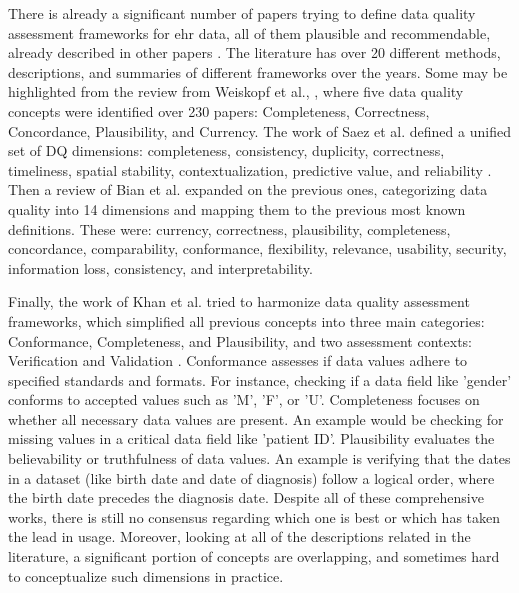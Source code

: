 
There is already a significant number of papers trying to define data quality assessment frameworks for \ac{ehr} data, all of them plausible and recommendable, already described in other papers \cite{bianAssessingPracticeData2020}. The literature has over 20 different methods, descriptions, and summaries of different frameworks over the years. Some may be highlighted from the review from Weiskopf et al., \cite{weiskopfMethodsDimensionsElectronic2013}, where five data quality concepts were identified over 230 papers: Completeness, Correctness, Concordance, Plausibility, and Currency. 
The work of Saez et al. defined a unified set of DQ dimensions: completeness, consistency, duplicity, correctness, timeliness, spatial stability, contextualization, predictive value, and reliability \cite{saezOrganizingDataQuality2012}. Then a review of Bian et al. \cite{bianAssessingPracticeData2020} expanded on the previous ones, categorizing data quality into 14 dimensions and mapping them to the previous most known definitions. These were: currency, correctness, plausibility, completeness, concordance, comparability, conformance, flexibility, relevance, usability, security, information loss, consistency, and interpretability.

Finally, the work of Khan et al. tried to harmonize data quality assessment frameworks, which simplified all previous concepts into three main categories: Conformance, Completeness, and Plausibility, and two assessment contexts: Verification and Validation \cite{kahnHarmonizedDataQuality2016a}. Conformance  assesses if data values adhere to specified standards and formats. For instance, checking if a data field like 'gender' conforms to accepted values such as 'M', 'F', or 'U'. Completeness focuses on whether all necessary data values are present. An example would be checking for missing values in a critical data field like 'patient ID'. Plausibility evaluates the believability or truthfulness of data values. An example is verifying that the dates in a dataset (like birth date and date of diagnosis) follow a logical order, where the birth date precedes the diagnosis date. Despite all of these comprehensive works, there is still no consensus regarding which one is best or which has taken the lead in usage. Moreover, looking at all of the descriptions related in the literature, a significant portion of concepts are overlapping, and sometimes hard to conceptualize such dimensions in practice.


